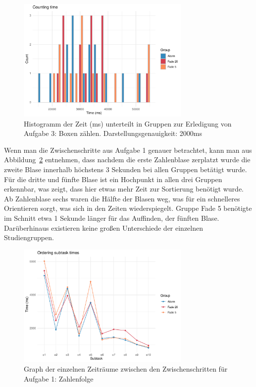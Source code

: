 \begin{figure}[H]
	\centering
	\includegraphics[width=0.75\textwidth]{./_StudyResults/countingTimeHist}
	\caption{Histogramm der Zeit (ms) unterteilt in Gruppen zur Erledigung von Aufgabe 3: Boxen zählen. Darstellungsgenauigkeit: 2000ms}
	\label{fig:countingTimeHistogram}
\end{figure}

Wenn man die Zwischenschritte aus Aufgabe 1 genauer betrachtet, kann man aus Abbildung~\ref{fig:timeTask1} entnehmen, dass nachdem die erste Zahlenblase zerplatzt wurde die zweite Blase innerhalb höchstens 3 Sekunden bei allen Gruppen betätigt wurde. Für die dritte und fünfte Blase ist ein Hochpunkt in allen drei Gruppen erkennbar, was zeigt, dass hier etwas mehr Zeit zur Sortierung benötigt wurde. Ab Zahlenblase sechs waren die Hälfte der Blasen weg, was für ein schnelleres Orientieren sorgt, was sich in den Zeiten wiederspiegelt. Gruppe Fade 5 benötigte im Schnitt etwa 1 Sekunde länger für das Auffinden, der fünften Blase. Darüberhinaus existieren keine großen Unterschiede der einzelnen Studiengruppen.
 
\begin{figure}[H]
	\centering
	\includegraphics[width=0.75\textwidth]{./_StudyResults/timeTask1}
	\caption{Graph der einzelnen Zeiträume zwischen den Zwischenschritten für Aufgabe 1: Zahlenfolge}
	\label{fig:timeTask1}
\end{figure}

